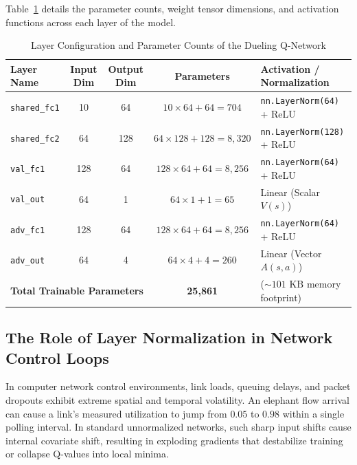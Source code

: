 Table~\ref{tab:layer_specifications} details the parameter counts, weight tensor dimensions, and activation functions across each layer of the model.

\begin{table}[htbp]
\centering
\caption{Layer Configuration and Parameter Counts of the Dueling Q-Network}
\label{tab:layer_specifications}
\small
\begin{tabularx}{\textwidth}{l c c c X}
\toprule
\textbf{Layer Name} & \textbf{Input Dim} & \textbf{Output Dim} & \textbf{Parameters} & \textbf{Activation / Normalization} \\
\midrule
\texttt{shared\_fc1} & 10 & 64 & $10 \times 64 + 64 = 704$ & \texttt{nn.LayerNorm(64)} + ReLU \\
\texttt{shared\_fc2} & 64 & 128 & $64 \times 128 + 128 = 8,320$ & \texttt{nn.LayerNorm(128)} + ReLU \\
\addlinespace
\texttt{val\_fc1} & 128 & 64 & $128 \times 64 + 64 = 8,256$ & \texttt{nn.LayerNorm(64)} + ReLU \\
\texttt{val\_out} & 64 & 1 & $64 \times 1 + 1 = 65$ & Linear (Scalar $V(s)$) \\
\addlinespace
\texttt{adv\_fc1} & 128 & 64 & $128 \times 64 + 64 = 8,256$ & \texttt{nn.LayerNorm(64)} + ReLU \\
\texttt{adv\_out} & 64 & 4 & $64 \times 4 + 4 = 260$ & Linear (Vector $A(s, a)$) \\
\midrule
\multicolumn{3}{l}{\textbf{Total Trainable Parameters}} & \textbf{25,861} & ($\sim 101\text{ KB}$ memory footprint) \\
\bottomrule
\end{tabularx}
\end{table}

\subsection{The Role of Layer Normalization in Network Control Loops}
In computer network control environments, link loads, queuing delays, and packet dropouts exhibit extreme spatial and temporal volatility. An elephant flow arrival can cause a link's measured utilization to jump from $0.05$ to $0.98$ within a single polling interval. In standard unnormalized networks, such sharp input shifts cause internal covariate shift, resulting in exploding gradients that destabilize training or collapse Q-values into local minima.

